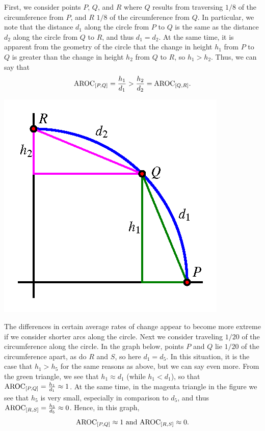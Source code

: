 \documentclass[nooutcomes, noauthor]{ximera}
\begin{document}
First, we consider points \(P\), \(Q\), and \(R\) where \(Q\) results from traversing \(1/8\) of the circumference from \(P\), and \(R\) \(1/8\) of the circumference from \(Q\).  In particular, we note that the distance \(d_1\) along the circle from \(P\) to \(Q\) is the same as the distance \(d_2\) along the circle from \(Q\) to \(R\), and thus \(d_1 = d_2\).  At the same time, it is apparent from the geometry of the circle that the change in height \(h_1\) from \(P\) to \(Q\) is greater than the change in height \(h_2\) from \(Q\) to \(R\), so \(h_1 > h_2\).  Thus, we can say that%
\begin{equation*}
\mathrm{AROC}_{[P,Q]} = \frac{h_1}{d_1} > \frac{h_2}{d_2} = \mathrm{AROC}_{[Q,R]} \text{.}
\end{equation*}

\begin{image}
\includegraphics{traversing-circular-aroc-circle-eighth.png}
\end{image}

The differences in certain average rates of change appear to become more extreme if we consider shorter arcs along the circle.  Next we consider traveling \(1/20\) of the circumference along the circle.  In the graph below, points \(P\) and \(Q\) lie \(1/20\) of the circumference apart, as do \(R\) and \(S\), so here \(d_1 = d_5\).  In this situation, it is the case that \(h_1 > h_5\) for the same reasons as above, but we can say even more.  From the green triangle, we see that \(h_1 \approx d_1\) (while \(h_1 < d_1\)), so that \(\mathrm{AROC}_{[P,Q]} = \frac{h_1}{d_1} \approx 1\).  At the same time, in the magenta triangle in the figure we see that \(h_5\) is very small, especially in comparison to \(d_5\), and thus \(\mathrm{AROC}_{[R,S]} = \frac{h_5}{d_5} \approx 0\).  Hence, in this graph,%
\begin{equation*}
\mathrm{AROC}_{[P,Q]} \approx 1 \text{ and } \mathrm{AROC}_{[R,S]} \approx 0\text{.}
\end{equation*}
\end{document}
